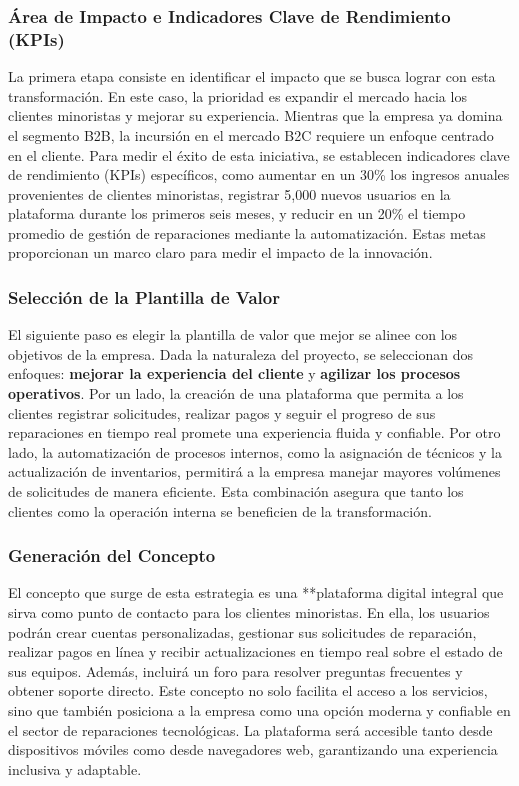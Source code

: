 \subsubsection{Área de Impacto e Indicadores Clave de Rendimiento (KPIs)}

La primera etapa consiste en identificar el impacto que se busca lograr con esta
transformación. En este caso, la prioridad es expandir el mercado hacia los
clientes minoristas y mejorar su experiencia. Mientras que la empresa ya domina el
segmento B2B, la incursión en el mercado B2C requiere un enfoque centrado en el
cliente. Para medir el éxito de esta iniciativa, se establecen indicadores clave
de rendimiento (KPIs) específicos, como aumentar en un 30\% los ingresos anuales
provenientes de clientes minoristas, registrar 5,000 nuevos usuarios en la plataforma
durante los primeros seis meses, y reducir en un 20\% el tiempo promedio de gestión
de reparaciones mediante la automatización. Estas metas proporcionan un marco
claro para medir el impacto de la innovación.

\subsubsection{Selección de la Plantilla de Valor}

El siguiente paso es elegir la plantilla de valor que mejor se alinee con los objetivos
de la empresa. Dada la naturaleza del proyecto, se seleccionan dos enfoques:
\textbf{mejorar la experiencia del cliente} y \textbf{agilizar los procesos
	operativos}. Por un lado, la creación de una plataforma que permita a los
clientes registrar solicitudes, realizar pagos y seguir el progreso de sus reparaciones
en tiempo real promete una experiencia fluida y confiable. Por otro lado, la automatización
de procesos internos, como la asignación de técnicos y la actualización de
inventarios, permitirá a la empresa manejar mayores volúmenes de solicitudes de manera
eficiente. Esta combinación asegura que tanto los clientes como la operación
interna se beneficien de la transformación.

\subsubsection{Generación del Concepto}

El concepto que surge de esta estrategia es una **plataforma digital integral que
sirva como punto de contacto para los clientes minoristas. En ella, los usuarios
podrán crear cuentas personalizadas, gestionar sus solicitudes de reparación, realizar
pagos en línea y recibir actualizaciones en tiempo real sobre el estado de sus equipos.
Además, incluirá un foro para resolver preguntas frecuentes y obtener soporte directo.
Este concepto no solo facilita el acceso a los servicios, sino que también posiciona
a la empresa como una opción moderna y confiable en el sector de reparaciones tecnológicas.
La plataforma será accesible tanto desde dispositivos móviles como desde
navegadores web, garantizando una experiencia inclusiva y adaptable.

